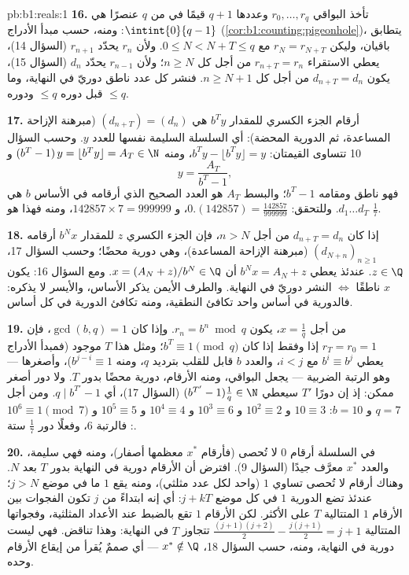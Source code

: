 \begin{solution}{pb:b1:reals:1}
\textbf{16.} تأخذ البواقي $r_0, \dots, r_q$ وعددها $q + 1$ قيمًا
في  من $q$ عنصرًا هي $\intint{0}{q-1}$: ومنه، حسب مبدأ
الأدراج (\cref{cor:b1:counting:pigeonhole})، يتطابق باقيان، وليكن
$r_N = r_{N+T}$ مع $0 \leq N < N + T \leq q$. ولأن $r_n$
يحدّد $r_{n+1}$ (السؤال 14)، يعطي الاستقراء $r_{n+T} =
r_n$ من أجل كل $n \geq N$؛ ولأن $r_{n-1}$ يحدّد $d_n$
(السؤال 15)، يكون $d_{n+T} = d_n$ من أجل كل $n \geq N + 1$. فنشر كل
عدد ناطق دوريّ في النهاية، وما قبل دوره $\leq
q$ ودوره $\leq q$.

\textbf{17.} أرقام الجزء الكسري للمقدار $b^T y$ هي
$(d_{n+T}) = (d_n)$ (مبرهنة الإزاحة المساعدة، ثم الدورية المحضة): أي
السلسلة السليمة نفسها للعدد $y$. وحسب السؤال 10 تتساوى القيمتان:
$b^T y - \lfloor b^T y \rfloor = y$، ومنه $(b^T - 1)\,y = \lfloor
b^T y \rfloor = A_T \in \N$ و
\[
y = \frac{A_T}{b^T - 1} ,
\]
فهو ناطق ومقامه  $b^T - 1$؛ والبسط $A_T$
هو العدد الصحيح الذي أرقامه في الأساس $b$ هي $d_1 \dots d_T$. وللتحقق:
$0.(142857) = \frac{142857}{999999}$، و $142857 \times 7 =
999999$، ومنه فهذا هو $\frac 17$.

\textbf{18.} إذا كان $d_{n+T} = d_n$ من أجل $n > N$، فإن الجزء الكسري
$z$ للمقدار $b^N x$ أرقامه $(d_{N+n})_{n\geq1}$ (مبرهنة الإزاحة المساعدة)،
وهي دورية محضًا؛ وحسب السؤال 17، $z \in \Q$. عندئذ يعطي $b^N
x = A_N + z$ أن $x = (A_N + z)/b^N \in \Q$. ومع السؤال 16:
يكون $x$ ناطقًا $\iff$ النشر دوريّ في النهاية. والطرف الأيمن
يذكر الأساس، والأيسر لا يذكره: فالدورية في أساس واحد
تكافئ النطقية، ومنه تكافئ الدورية في كل أساس.

\textbf{19.} من أجل $x = \frac 1q$، يكون $r_n = b^n \bmod q$. وإذا كان
$\gcd(b, q) = 1$، فإن $r_T = r_0 = 1$ إذا وفقط إذا كان $b^T \equiv
1 \pmod q$؛ ومثل هذا $T$ موجود (فمبدأ الأدراج يعطي $b^i \equiv b^j$ مع
$i < j$، والعدد $b$ قابل للقلب بترديد $q$، ومنه $b^{j-i} \equiv
1$)، وأصغرها --- وهو الرتبة الضربية --- يجعل
البواقي، ومنه الأرقام، دورية محضًا بدور $T$.
ولا دور أصغر ممكن: إذ إن دورًا $T'$ سيعطي $(b^{T'}
- 1)\frac1q \in \N$ (السؤال 17)، أي $q \mid b^{T'} - 1$.
ومن أجل $q = 7$ و $b = 10$: $10 \equiv 3$ و $10^2 \equiv 2$ و $10^3
\equiv 6$ و $10^4 \equiv 4$ و $10^5 \equiv 5$ و $10^6 \equiv 1
\pmod 7$: فالرتبة $6$، وفعلًا دور $\frac 17$ ستة.

\textbf{20.} في السلسلة أرقام $0$ لا تُحصى (فأرقام $x^*$
معظمها أصفار)، ومنه فهي سليمة، والعدد $x^*$ معرَّف جيدًا
(السؤال 9). افترض أن الأرقام دورية في النهاية بدور
$T$ بعد $N$. وهناك أرقام لا تُحصى تساوي $1$ (واحد لكل
عدد مثلثي)، ومنه يقع $1$ ما في موضع $j > N$؛ عندئذ
تضع الدورية $1$ في كل موضع $j + kT$: أي إنه ابتداءً من $j$
تكون الفجوات بين الأرقام $1$ المتتالية $T$ على الأكثر. لكن
الأرقام $1$ تقع بالضبط عند الأعداد المثلثية، وفجواتها
المتتالية $\frac{(j+1)(j+2)}{2} - \frac{j(j+1)}{2} = j + 1$ تتجاوز $T$
في النهاية: وهذا تناقض. فهي ليست دورية في النهاية، ومنه، حسب
السؤال 18، $x^* \notin \Q$ --- أي صممٌ يُقرأ من
إيقاع الأرقام وحده.


\end{solution}
